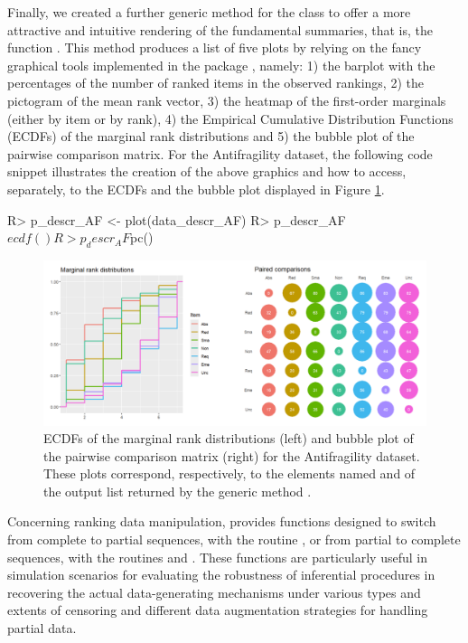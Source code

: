 Finally, we created a further generic method for the class  to offer a more attractive and intuitive rendering of the fundamental summaries, that is, the function . This method produces a list of five plots by relying on the fancy graphical tools implemented in the  package \citep{ggplot}, namely: 1) the barplot with the percentages of the number of ranked items in the observed rankings, 2) the pictogram of the mean rank vector, 3) the heatmap of the first-order marginals (either by item or by rank), 4) the Empirical Cumulative Distribution Functions (ECDFs) of the marginal rank distributions and 5) the bubble plot of the pairwise comparison matrix. For the Antifragility dataset, the following code snippet illustrates the creation of the above graphics and how to access, separately, to the  ECDFs  and the bubble plot displayed in Figure \ref{fig:plot.data_descr}.
\begin{example}
R> p_descr_AF <- plot(data_descr_AF)
R> p_descr_AF$ecdf()
R> p_descr_AF$pc()
\end{example}

\begin{figure}[t]
      \centering
             \includegraphics[width=\textwidth]{figures/RJ2025_paper_plotsanti.png}
          \caption{ECDFs of the marginal rank distributions (left) and bubble plot of the pairwise comparison matrix (right) for the Antifragility dataset. These plots correspond, respectively, to the elements named  and  of the output list returned by the generic method .}
        \label{fig:plot.data_descr}
\end{figure}


Concerning ranking data manipulation,  provides functions designed to switch from complete to partial sequences, with the routine , or from partial to complete sequences, with the routines  and . These functions are particularly useful in simulation scenarios for evaluating the robustness of inferential procedures in recovering the actual data-generating mechanisms under various types and extents of censoring and different data augmentation strategies for handling partial data.

